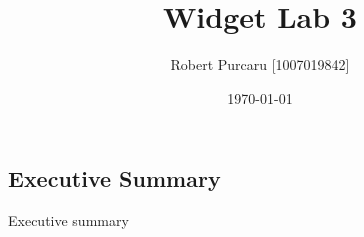 \documentclass[12pt]{article}
\begin{document}
    \title{Widget Lab 3}
        \author{Robert Purcaru [1007019842]}
        \date{\today}
    \maketitle


    \newpage

\begin{multicols*}{2}
    \section*{Executive Summary}
        Executive summary

    \newpage
\end{multicols*}
    \tableofcontents
\end{document}
